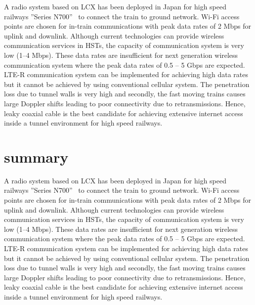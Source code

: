 A radio system based on LCX has been deployed in Japan for high speed railways ''Series N700''~\cite{takatsu2007history} to connect the train to ground network. Wi-Fi access points are chosen for in-train communications with peak data rates of 2 Mbps for uplink and downlink. Although current technologies can provide wireless communication services in HSTs, the capacity of communication system is very low (1--4 Mbps). These data rates are insufficient for next generation wireless communication system where the peak data rates of 0.5 -- 5 Gbps are expected. LTE-R communication system can be implemented for achieving high data rates but it cannot be achieved by using conventional cellular system. The penetration loss due to tunnel walls is very high and secondly, the fast moving trains causes large Doppler shifts leading to poor connectivity due to retransmissions. Hence, leaky coaxial cable is the best candidate for achieving extensive internet access inside a tunnel environment for high speed railways.

\section{summary}
A radio system based on LCX has been deployed in Japan for high speed railways ''Series N700''~\cite{takatsu2007history} to connect the train to ground network. Wi-Fi access points are chosen for in-train communications with peak data rates of 2 Mbps for uplink and downlink. Although current technologies can provide wireless communication services in HSTs, the capacity of communication system is very low (1--4 Mbps). These data rates are insufficient for next generation wireless communication system where the peak data rates of 0.5 -- 5 Gbps are expected. LTE-R communication system can be implemented for achieving high data rates but it cannot be achieved by using conventional cellular system. The penetration loss due to tunnel walls is very high and secondly, the fast moving trains causes large Doppler shifts leading to poor connectivity due to retransmissions. Hence, leaky coaxial cable is the best candidate for achieving extensive internet access inside a tunnel environment for high speed railways.